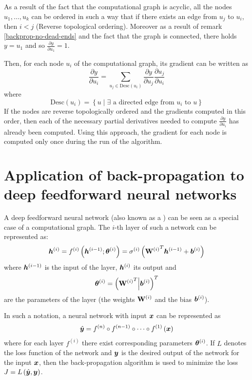 \begin{example}
As a result of the fact that the computational graph is acyclic, all the nodes \( u_1, \dots, u_k \) can be ordered in such a way that if there exists an edge from \( u_j \) to \( u_i \), then \( i < j \) (Reverse topological ordering). Moreover as a result of remark \ref{backprop-no-dead-ends} and the fact that the graph is connected, there holds \( y = u_1 \) and so \( \frac{\partial y}{\partial u_1} = 1 \).

Then, for each node \( u_i \) of the computational graph, its gradient can be written as
\[ \frac{\partial y}{\partial u_i} = \sum_{u_j \in \mathrm{Desc} \left( u_i \right)} \frac{\partial y}{\partial u_j} \frac{\partial u_j}{\partial u_i} \]
where
\[ \mathrm{Desc} \left( u_i \right) = \left\{ u \middle| \exists \text{ a directed edge from } u_i \text{ to } u \right\} \]
If the nodes are reverse topologically ordered and the gradients computed in this order, then each of the necessary partial derivatives needed to compute \( \frac{\partial y}{\partial u_i} \) has already been computed. Using this approach, the gradient for each node is computed only once during the run of the algorithm. 

\section{Application of back-propagation to deep feedforward neural networks}
A deep feedforward neural network (also known as a ) can be seen as a special case of a computational graph. The \( i \)-th layer of such a network can be represented as:
\[ \bm h^{(i)} = f^{(i)} \left( \bm{h}^{(i - 1)} ; \bm{\theta}^{(i)} \right) = \sigma^{(i)} \left( {\mathbf{W}^{(i)}}^T \bm h^{(i - 1)} + \bm{b}^{(i)} \right) \]
where \( \bm{h}^{(i - 1)} \) is the input of the layer, \( \bm{h}^{(i)} \) its output and
\[ \bm{\theta}^{(i)} = \left( {\mathbf{W}^{(i)}}^T \middle| \bm{b}^{(i)} \right)^T \]
are the parameters of the layer (the weights \( \mathbf{W}^{(i)} \) and the bias \( \bm{b}^{(i)} \)).

In such a notation, a neural network with input \( \bm{x} \) can be represented as
\[ \hat{\bm{y}} = f^{(n)} \circ f^{(n - 1)} \circ \dots \circ f^{(1)} \left( \bm{x} \right) \]
where for each layer \( f^{(i)} \) there exist corresponding parameters \( \bm{\theta}^{(i)} \). If \( L \) denotes the loss function of the network and \( \bm{y} \) is the desired output of the network for the input \( \bm{x} \), then the back-propagation algorithm is used to minimize the loss \( J = L \left( \hat{\bm{y}}, \bm{y} \right) \).


\end{example}
